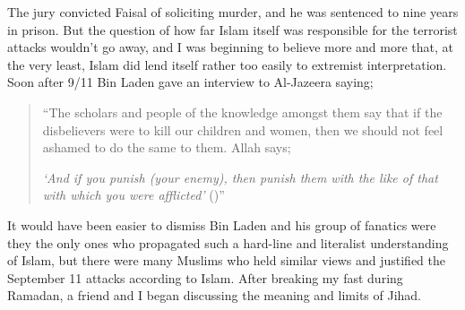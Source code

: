 \documentclass[12pt]{memoir}
\begin{document}
The jury convicted Faisal of soliciting murder,
and he was sentenced to nine years in prison.
But the question of how far Islam itself was responsible
for the terrorist attacks wouldn’t go away,
and I was beginning to believe more and more that, at the very least,
Islam did lend itself rather too easily to extremist interpretation.
Soon after 9/11 Bin Laden gave an interview to Al-Jazeera saying;

\begin{quote}
“The scholars and people of the knowledge amongst them say
that if the disbelievers were to kill our children and women,
then we should not feel ashamed to do the same to them.
Allah says;

\emph{‘And if you punish (your enemy), then punish them with the like
of that with which you were afflicted’} ()”
\end{quote}

It would have been easier to dismiss Bin Laden and his group of fanatics
were they the only ones who propagated
such a hard-line and literalist understanding of Islam,
but there were many Muslims who held similar views
and justified the September 11 attacks according to Islam.
After breaking my fast during Ramadan,
a friend and I began discussing the meaning and limits of Jihad.
\end{document}
